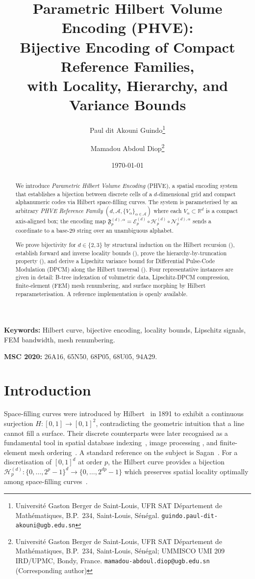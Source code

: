 \documentclass[11pt,a4paper]{article}
\title{\textbf{Parametric Hilbert Volume Encoding (PHVE):\\
Bijective Encoding of Compact Reference Families,\\
with Locality, Hierarchy, and Variance Bounds}}
\author{
  Paul dit Akouni Guindo\thanks{Universit\'e Gaston Berger de Saint-Louis,
   UFR SAT D\'epartement de Math\'ematiques, B.P.~234, Saint-Louis,
   S\'en\'egal. \texttt{guindo.paul-dit-akouni@ugb.edu.sn}}
  \and
  Mamadou Abdoul Diop\thanks{Universit\'e Gaston Berger de Saint-Louis,
   UFR SAT D\'epartement de Math\'ematiques, B.P.~234, Saint-Louis,
   S\'en\'egal; UMMISCO UMI 209 IRD/UPMC, Bondy, France.
   \texttt{mamadou-abdoul.diop@ugb.edu.sn} (Corresponding author)}
}
\date{\today}
\theoremstyle{plain}
\theoremstyle{definition}
\theoremstyle{remark}
\newcommand{\R}{\mathbb{R}}
\newcommand{\Hil}{\mathcal{H}}
\newcommand{\Enc}{\mathcal{E}}
\newcommand{\Nor}{\mathcal{N}}
\newcommand{\Fc}{\mathfrak{F}}
\begin{document}
\maketitle

\begin{abstract}
We introduce \emph{Parametric Hilbert Volume Encoding} (PHVE), a spatial
encoding system that establishes a bijection between discrete cells of a
$d$-dimensional grid and compact alphanumeric codes via Hilbert space-filling
curves. The system is parameterised by an arbitrary
\emph{PHVE Reference Family} $(d,\mathcal{A},\{V_\alpha\}_{\alpha\in\mathcal{A}})$
where each $V_\alpha\subset\R^d$ is a compact axis-aligned box;
the encoding map
$\Fc_p^{(d),\alpha} = \Enc_p^{(d)}\circ \Hil_p^{(d)}\circ \Nor_p^{(d),\alpha}$
sends a coordinate to a base-$29$ string over an unambiguous alphabet.

We prove bijectivity for $d\in\{2,3\}$ by structural induction on the Hilbert
recursion (), establish forward and inverse
locality bounds (), prove the hierarchy-by-truncation
property (), and derive a Lipschitz variance bound for
Differential Pulse-Code Modulation (DPCM) along the Hilbert traversal
(). Four representative instances are given in detail:
B-tree indexation of volumetric data, Lipschitz-DPCM compression,
finite-element (FEM) mesh renumbering, and surface morphing
by Hilbert reparameterisation. A reference implementation is openly available.
\end{abstract}

\noindent\textbf{Keywords:} Hilbert curve, bijective encoding, locality bounds,
Lipschitz signals, FEM bandwidth, mesh renumbering.

\noindent\textbf{MSC 2020:} 26A16, 65N50, 68P05, 68U05, 94A29.

\section{Introduction}\label{sec:intro}

Space-filling curves were introduced by Hilbert~\cite{hilbert1891} in
1891 to exhibit a continuous surjection $H:[0,1]\to[0,1]^2$, contradicting
the geometric intuition that a line cannot fill a surface. Their
discrete counterparts were later recognised as a fundamental tool in
spatial database indexing~\cite{lawder2001}, image processing
\cite{moon2001}, and finite-element mesh ordering~\cite{cuthill1969}.
A standard reference on the subject is Sagan~\cite{sagan1994}. For a
discretisation of $[0,1]^d$ at order $p$, the Hilbert curve provides a
bijection $\mathcal{H}_p^{(d)}: \{0,\dots,2^p-1\}^d \to \{0,\dots,2^{dp}-1\}$
which preserves spatial locality optimally among space-filling
curves~\cite{niedermeier2002}.
\end{document}
